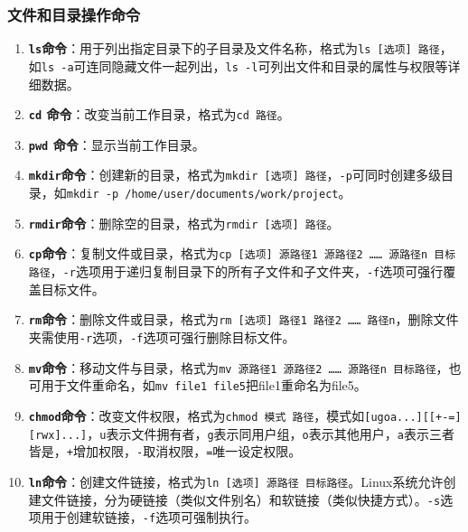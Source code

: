\subsubsection{文件和目录操作命令}
\begin{enumerate}[label=\arabic*.]
    \item \textbf{\texttt{ls}命令}：用于列出指定目录下的子目录及文件名称，格式为\texttt{ls [选项] 路径}，如\texttt{ls -a}可连同隐藏文件一起列出，\texttt{ls -l}可列出文件和目录的属性与权限等详细数据。
    \item \textbf{\texttt{cd} 命令}：改变当前工作目录，格式为\texttt{cd 路径}。
    \item \textbf{\texttt{pwd} 命令}：显示当前工作目录。
    \item \textbf{\texttt{mkdir}命令}：创建新的目录，格式为\texttt{mkdir [选项] 路径}，\texttt{-p}可同时创建多级目录，如\texttt{mkdir -p /home/user/documents/work/project}。
    \item \textbf{\texttt{rmdir}命令}：删除空的目录，格式为\texttt{rmdir [选项] 路径}。
    \item \textbf{\texttt{cp}命令}：复制文件或目录，格式为\texttt{cp [选项] 源路径1 源路径2 …… 源路径n 目标路径}，\texttt{-r}选项用于递归复制目录下的所有子文件和子文件夹，\texttt{-f}选项可强行覆盖目标文件。
    \item \textbf{\texttt{rm}命令}：删除文件或目录，格式为\texttt{rm [选项] 路径1 路径2 …… 路径n}，删除文件夹需使用\texttt{-r}选项，\texttt{-f}选项可强行删除目标文件。
    \item \textbf{\texttt{mv}命令}：移动文件与目录，格式为\texttt{mv 源路径1 源路径2 …… 源路径n 目标路径}，也可用于文件重命名，如\texttt{mv file1 file5}把file1重命名为file5。
    \item \textbf{\texttt{chmod}命令}：改变文件权限，格式为\texttt{chmod 模式 路径}，模式如\texttt{[ugoa...][[+-=][rwx]...]}，\texttt{u}表示文件拥有者，\texttt{g}表示同用户组，\texttt{o}表示其他用户，\texttt{a}表示三者皆是，\texttt{+}增加权限，\texttt{-}取消权限，\texttt{=}唯一设定权限。
    \item \textbf{\texttt{ln}命令}：创建文件链接，格式为\texttt{ln [选项] 源路径 目标路径}。Linux系统允许创建文件链接，分为硬链接（类似文件别名）和软链接（类似快捷方式）。\texttt{-s}选项用于创建软链接，\texttt{-f}选项可强制执行。

\end{enumerate}
